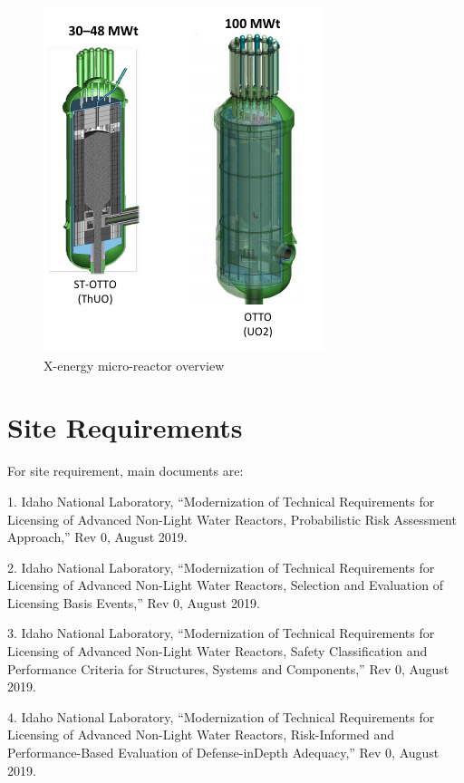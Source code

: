\documentclass[10pt,a4paper]{article}
\begin{document}
\begin{figure}[hbtp]
\centering
\includegraphics[scale=1]{Figs/xoverview.jpeg}
\caption{X-energy micro-reactor overview}
\label{xo}
\end{figure}

\section{Site Requirements}
For site requirement, main documents are: 

1. Idaho National Laboratory, “Modernization of Technical Requirements for Licensing of Advanced Non-Light Water Reactors, Probabilistic Risk Assessment Approach,” Rev 0, August 2019.

2. Idaho National Laboratory, “Modernization of Technical Requirements for Licensing of Advanced Non-Light Water Reactors, Selection and Evaluation of Licensing Basis Events,” Rev 0, August 2019.

3. Idaho National Laboratory, “Modernization of Technical Requirements for Licensing of Advanced Non-Light Water Reactors, Safety Classification and Performance Criteria for Structures, Systems and Components,” Rev 0, August 2019.

4. Idaho National Laboratory, “Modernization of Technical Requirements for Licensing of Advanced Non-Light Water Reactors, Risk-Informed and Performance-Based Evaluation of Defense-inDepth Adequacy,” Rev 0, August 2019.
\end{document}
